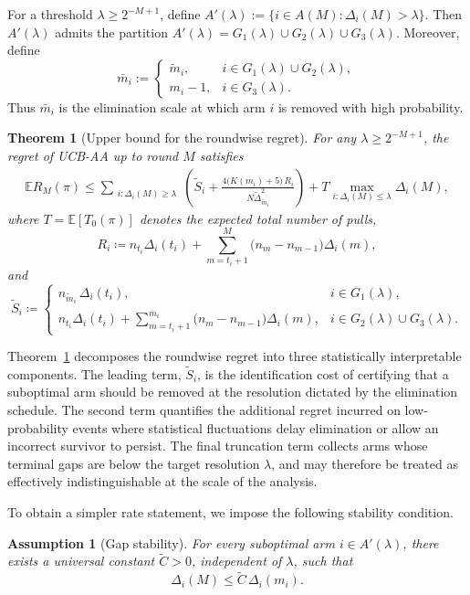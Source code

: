 \documentclass[11pt]{article}
\newtheorem{theorem}{Theorem}
\newtheorem{assumption}{Assumption}
\begin{document}
For a threshold \(\lambda \ge 2^{-M+1}\), define
\(
A'(\lambda):=\{i\in A(M):\Delta_i(M)>\lambda\}.
\)
Then \(A'(\lambda)\) admits the partition
\(
A'(\lambda)=G_1(\lambda)\cup G_2(\lambda)\cup G_3(\lambda).
\)
Moreover, define
\[
\bar m_i:=
\begin{cases}
\tilde m_i, & i\in G_1(\lambda)\cup G_2(\lambda),\\
m_i-1, & i\in G_3(\lambda).
\end{cases}
\]
Thus \(\bar m_i\) is the elimination scale at which arm \(i\) is removed with high probability.

\begin{theorem}[Upper bound for the roundwise regret]
\label{thm:ucb-aa-upper}
For any $\lambda\geq 2^{-M+1}$, the regret of UCB-AA up to round $M$ satisfies
\begin{align*}
\mathbb{E}R_M(\pi)
\leq
\sum_{\substack{i: \Delta_i(M) \geq \lambda}}
\left(
\tilde{S}_i
+
\frac{4\bigl(K(m_i)+5\bigr)\,R_i}{N\tilde{\Delta}_{\tilde{m}_i}^2}
\right)
+
T\max_{i:\Delta_i(M)\leq \lambda}\Delta_i(M),
\end{align*}
where $T = \mathbb{E}[T_0(\pi)]$ denotes the expected total number of pulls,
\[
R_i\coloneqq n_{t_i}\Delta_i(t_i)+\sum_{m=t_i+1}^M\bigl(n_m-n_{m-1}\bigr)\Delta_i(m),
\]
and
\[
\tilde{S}_i\coloneqq
\begin{cases}
    n_{\tilde{m}_i}\,\Delta_i(t_i), & i\in G_1(\lambda),\\
    n_{t_i}\Delta_i(t_i)+\sum_{m=t_i+1}^{\overline{m}_i}\bigl(n_m-n_{m-1}\bigr)\Delta_i(m), & i\in G_2(\lambda)\cup G_3(\lambda).
\end{cases}
\]
\end{theorem}

Theorem~\ref{thm:ucb-aa-upper} decomposes the roundwise regret into three statistically interpretable components. The leading term, \(\tilde S_i\), is the identification cost of certifying that a suboptimal arm should be removed at the resolution dictated by the elimination schedule. The second term quantifies the additional regret incurred on low-probability events where statistical fluctuations delay elimination or allow an incorrect survivor to persist. The final truncation term collects arms whose terminal gaps are below the target resolution \(\lambda\), and may therefore be treated as effectively indistinguishable at the scale of the analysis.

To obtain a simpler rate statement, we impose the following stability condition.

\begin{assumption}[Gap stability]
\label{ass:gap_stability}
For every suboptimal arm \(i \in A'(\lambda)\), there exists a universal constant \(\tilde{C}>0\), independent of \(\lambda\), such that
\[
\Delta_i(M) \leq \tilde{C}\,\Delta_i(m_i).
\]
\end{assumption}
\end{document}

